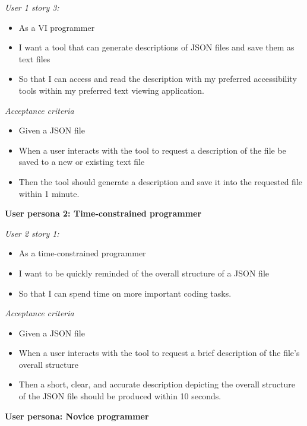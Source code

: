 \documentclass{l4proj}
\begin{document}
\begin{small}
\begin{multicols}{2}
\end{multicols}

\begin{multicols}{2}
\textit{User 1 story 3:}
\begin{itemize}
\item As a VI programmer
\item I want a tool that can generate descriptions of JSON files and save them as text files
\item So that I can access and read the description with my preferred accessibility tools within my preferred text viewing application.
\end{itemize}
\columnbreak

\textit{Acceptance criteria}
\begin{itemize}
\item Given a JSON file
\item When a user interacts with the tool to request a description of the file be saved to a new or existing text file
\item Then the tool should generate a description and save it into the requested file within 1 minute.
\end{itemize}
\end{multicols}

\begin{multicols}{2}
\textbf{User persona 2: Time-constrained programmer}

\textit{User 2 story 1:}
\begin{itemize}
\item As a time-constrained programmer
\item I want to be quickly reminded of the overall structure of a JSON file
\item So that I can spend time on more important coding tasks.
\end{itemize}
\columnbreak
\textit{Acceptance criteria}
\begin{itemize}
\item Given a JSON file
\item When a user interacts with the tool to request a brief description of the file's overall structure
\item Then a short, clear, and accurate description depicting the overall structure of the JSON file should be produced within 10 seconds.
\end{itemize}
\end{multicols}

\begin{multicols}{2}
\textbf{User persona: Novice programmer}


\end{multicols}
\end{small}
\end{document}
